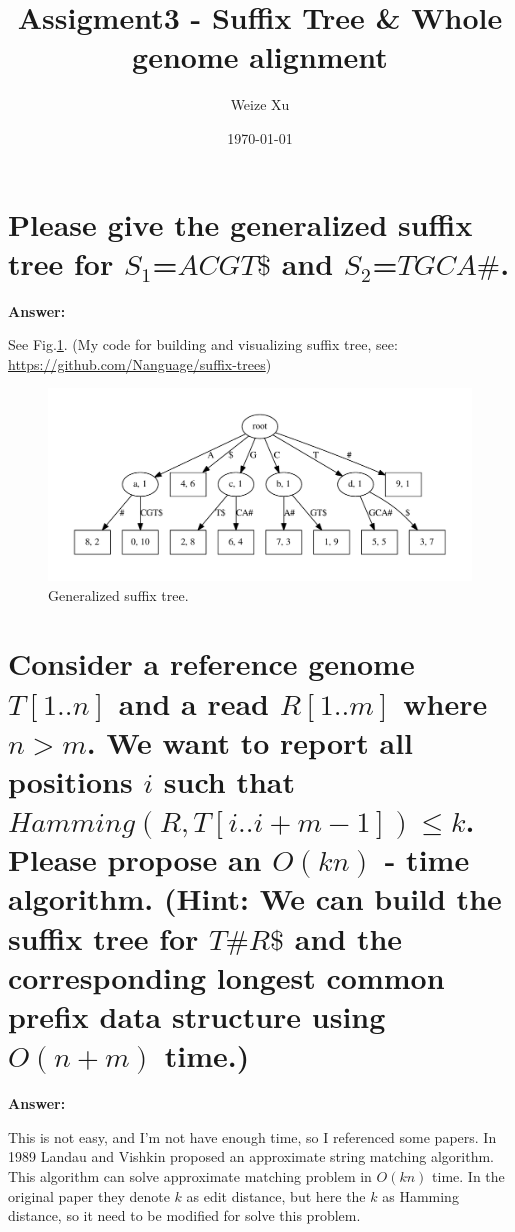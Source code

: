 \documentclass{article}
\title{Assigment3 - Suffix Tree \& Whole genome alignment}
\date{\today}
\author{Weize Xu}
\begin{document}
\maketitle

\section{Please give the generalized suffix tree for $S_1$=$ACGT\$$ and $S_2$=$TGCA\#$.}

\large{\textbf{Answer:}}

See Fig.\ref{fig:q1}. (My code for building and visualizing suffix tree, see: 
\url{https://github.com/Nanguage/suffix-trees})

\begin{figure}[h]
    \includegraphics[width=\linewidth]{./img/q1.pdf}
    \caption{Generalized suffix tree.}
    \label{fig:q1}
\end{figure}

\section{Consider a reference genome $T[1..n]$ and a read $R[1..m]$ where $n > m$. We
want to report all positions $i$ such that $Hamming(R, T[i..i+m-1]) \leq k$. Please
propose an $O(kn)$ - time algorithm. (Hint: We can build the suffix tree for
$T\#R\$$ and the corresponding longest common prefix data structure using 
$O(n+m)$ time.)}

\large{\textbf{Answer:}}

This is not easy, and I'm not have enough time, so I referenced some papers. 
In 1989 Landau and Vishkin proposed an approximate string matching algorithm\cite{landau1989fast}.
This algorithm can solve approximate matching problem in $O(kn)$ time.
In the original paper they denote $k$ as edit distance, but here the $k$ as Hamming distance,
so it need to be modified for solve this problem. \\
\end{document}
